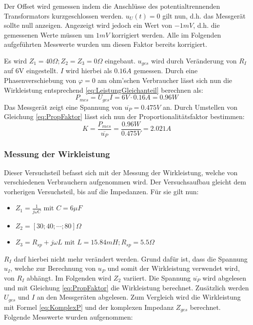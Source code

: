 Der Offset wird gemessen indem die Anschlüsse des potentialtrennenden Transformators kurzgeschlossen werden. $u_U(t)=0$ gilt nun, d.h. das Messgerät sollte null anzeigen.
Angezeigt wird jedoch ein Wert von $-1mV$, d.h. die gemessenen Werte müssen um $1mV$ korrigiert werden. Alle im Folgenden aufgeführten Messwerte wurden um diesen Faktor bereits korrigiert.

Es wird $Z_1 = 40\Omega; Z_2 = Z_3 = 0\Omega$ eingebaut. $u_{ges}$ wird durch Veränderung von $R_I$ auf 6V eingestellt. $I$ wird hierbei als $0.16A$ gemessen. Durch eine Phasenverschiebung von $\varphi = 0$ am ohm'schen Verbraucher lässt sich nun die Wirkleistung entsprechend \eqref{eq:LeistungGleichanteil} berechnen als:
\begin{equation*}
P_{mes}=U_{ges}I = 6V\cdot 0.16A = 0.96W
\end{equation*}
Das Messgerät zeigt eine Spannung von $\overline{u_P}=0.475V$ an. 
Durch Umstellen von Gleichung \eqref{eq:PropFaktor} lässt sich nun der Proportionalitätsfaktor bestimmen:
\begin{equation*}
K=\frac{P_{mes}}{\overline{u_P}} = \frac{0.96W}{0.475V} = 2.021A
\end{equation*}

\subsubsection{Messung der Wirkleistung}

Dieser Versuchsteil befasst sich mit der Messung der Wirkleistung, welche von verschiedenen Verbrauchern aufgenommen wird. Der Versuchsaufbau gleicht dem vorherigen Versuchsteil, bis auf die Impedanzen. Für sie gilt nun:
\begin{itemize}
\item $Z_1 = \frac{1}{j\omega C} \mbox{ mit } C = 6\mu F$
\item $Z_2 = [30; 40; \cdots; 80]\Omega$
\item $Z_3 = R_{sp} + j\omega L \mbox{ mit } L = 15.84mH; R_{sp} = 5.5\Omega$
\end{itemize}
$R_I$ darf hierbei nicht mehr verändert werden. Grund dafür ist, dass die Spannung $u_I$, welche zur Berechnung von $u_P$ und somit der Wirkleistung verwendet wird, von $R_I$ abhängt.
Im Folgenden wird $Z_2$ variiert. Die Spannung $\overline{u_P}$ wird abgelesen und mit Gleichung \eqref{eq:PropFaktor} die Wirkleistung berechnet. Zusätzlich werden $U_{ges}$ und $I$ an den Messgeräten abgelesen. Zum Vergleich wird die Wirkleistung mit Formel \eqref{eq:KomplexP} und der komplexen Impedanz $Z_{ges}$ berechnet.
\\
Folgende Messwerte wurden aufgenommen:

